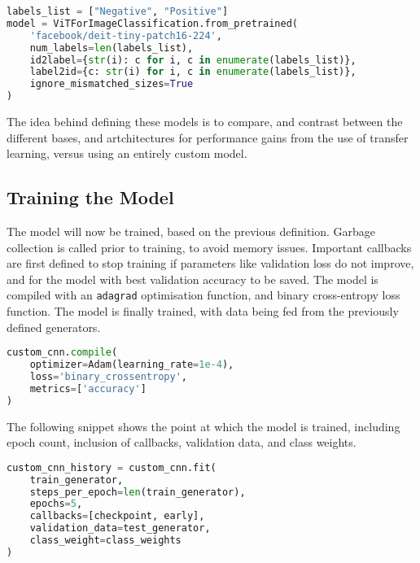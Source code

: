 \documentclass[../main]{subfiles}
\begin{document}
\begin{lstlisting}[language=Python, caption={Vision Transformer model definition.}]
labels_list = ["Negative", "Positive"]
model = ViTForImageClassification.from_pretrained(
    'facebook/deit-tiny-patch16-224',
    num_labels=len(labels_list),
    id2label={str(i): c for i, c in enumerate(labels_list)},
    label2id={c: str(i) for i, c in enumerate(labels_list)},
    ignore_mismatched_sizes=True
)
\end{lstlisting}


\noindent The idea behind defining these models is to compare, and contrast
between the different bases, and artchitectures for performance gains from the
use of transfer learning, versus using an entirely custom model.

\subsection{Training the Model}
The model will now be trained, based on the previous definition. Garbage
collection is called prior to training, to avoid memory issues. Important
callbacks are first defined to stop training if parameters like validation loss
do not improve, and for the model with best validation accuracy to be saved. The
model is compiled with an \texttt{adagrad} optimisation function, and binary
cross-entropy loss function. The model is finally trained, with data being fed
from the previously defined generators.

\begin{lstlisting}[language=Python, caption={Compiling the custom CNN using the Adam optimiser, and a binary cross-entropy loss function.}]
custom_cnn.compile(
    optimizer=Adam(learning_rate=1e-4),
    loss='binary_crossentropy',
    metrics=['accuracy']
)
\end{lstlisting}

\noindent The following snippet shows the point at which the model is trained,
including epoch count, inclusion of callbacks, validation data, and class
weights.

\begin{lstlisting}[language=Python, caption={Model training of the custom CNN.}]
custom_cnn_history = custom_cnn.fit(
    train_generator,
    steps_per_epoch=len(train_generator),
    epochs=5,
    callbacks=[checkpoint, early],
    validation_data=test_generator,
    class_weight=class_weights
)
\end{lstlisting}
\end{document}
